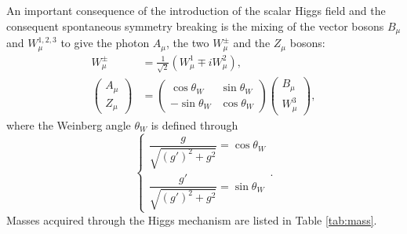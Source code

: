An important consequence of the introduction of the scalar Higgs 
field and the consequent spontaneous symmetry breaking
is the mixing of the vector bosons $B_{\mu}$ and $W^{1,2,3}_{\mu}$ 
to give the photon $A_{\mu}$, the two $W^{\pm}_{\mu}$ and 
the $Z_{\mu}$ bosons:
\begin{align}
  W_{\mu}^{\pm} & = \frac{1}{\sqrt{2}}\left(W_{\mu}^{1}\mp i W_{\mu}^{2}\right), \label{eq:Wpm} \\
  \left(
  \begin{array}{c}
  A_{\mu} \\ Z_{\mu}
  \end{array}
  \right)
  & =
  \left(
  \begin{array}{cc}
  \cos\theta_{W} & \sin\theta_{W} \\
  -\sin\theta_{W} & \cos\theta_{W}
  \end{array}
  \right)
  \left(
  \begin{array}{c}
  B_{\mu} \\ W_{\mu}^{3}
  \end{array}
  \right) , \label{eq:AZ}
\end{align}
where the Weinberg angle $\theta_{W}$ is defined through\begin{equation}\label{eq:weinb}
\left \{ \begin{array}{ll}
\dfrac{g}{\sqrt{(g')^{2}+g^{2}}} = \cos\theta_{W} \\
\dfrac{g'}{\sqrt{(g')^{2}+g^{2}}} = \sin\theta_{W} \end{array}\right. .
\end{equation} Masses acquired through the Higgs mechanism are listed in Table \ref{tab:mass}.


